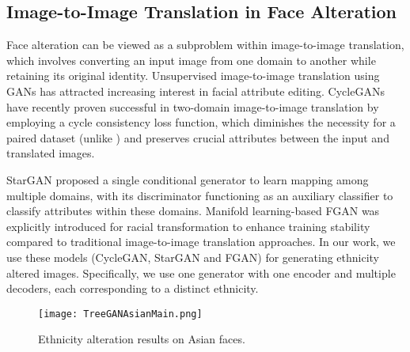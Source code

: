 {	
	\subsection{Image-to-Image Translation in Face Alteration}
	Face alteration can be viewed as a subproblem within image-to-image translation, which involves converting an input image from one domain to another while retaining its original identity. 
    Unsupervised image-to-image translation using GANs has attracted increasing interest in facial attribute editing. CycleGANs \cite{cyclegan} have recently proven successful in two-domain image-to-image translation by employing a cycle consistency loss function, which diminishes the necessity for a paired dataset (unlike \cite{isola2018imagetoimage}) and preserves crucial attributes between the input and translated images. 
	
	StarGAN \cite{StarGAN2018} proposed a single conditional generator to learn mapping among multiple domains, with its discriminator functioning as an auxiliary classifier to classify attributes within these domains. Manifold learning-based FGAN \cite{fgan} was explicitly introduced for racial transformation to enhance training stability compared to traditional image-to-image translation approaches. In our work, we use these models (CycleGAN, StarGAN and FGAN) for generating ethnicity altered images. Specifically, we use one generator with one encoder and multiple decoders, each corresponding to a distinct ethnicity.
 
	
	\begin{figure}
		\centering
		\texttt{[image: TreeGANAsianMain.png]}
		\caption{Ethnicity alteration results on Asian faces.}
		\label{fig:treeganasian}
		\vspace*{-0.3cm}
	\end{figure}
	
}
